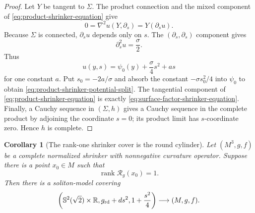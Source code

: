 \documentclass[10pt]{coll-l}
\newcommand{\R}{\mathbb{R}}
\newcommand{\Sph}{\mathbb{S}}
\newtheorem{corollary}[theorem]{Corollary}
\theoremstyle{definition}
\theoremstyle{remark}
\numberwithin{section}{chapter}
\numberwithin{equation}{chapter}
\begin{document}
\begin{proof}
Let $Y$ be tangent to $\Sigma$.  The product connection and the mixed
component of \eqref{eq:product-shrinker-equation} give
\[
       0=\nabla^2u(Y,\partial_s)=Y(\partial_su).
\]
Because $\Sigma$ is connected, $\partial_su$ depends only on $s$.  The
$(\partial_s,\partial_s)$ component gives
\[
                         \partial_s^2u=\frac\sigma2.
\]
Thus
\[
                 u(y,s)=\psi_0(y)+\frac\sigma4s^2+as
\]
for one constant $a$.  Put $s_0=-2a/\sigma$ and absorb the constant
$-\sigma s_0^2/4$ into $\psi_0$ to obtain
\eqref{eq:product-shrinker-potential-split}.  The tangential component of
\eqref{eq:product-shrinker-equation} is exactly
\eqref{eq:surface-factor-shrinker-equation}.  Finally, a Cauchy sequence in
$(\Sigma,h)$ gives a Cauchy sequence in the complete product by adjoining
the coordinate $s=0$; its product limit has $s$-coordinate zero.  Hence
$h$ is complete.
\end{proof}

\begin{corollary}[The rank-one shrinker cover is the round cylinder]
\label{cor:rank-one-shrinker-round-cylinder}
Let $(M^3,g,f)$ be a complete normalized shrinker with nonnegative
curvature operator.  Suppose there is a point $x_0\in M$ such that
\begin{equation}
                   \operatorname{rank}\mathcal R_g(x_0)=1.                \label{eq:rank-one-shrinker-witness}
\end{equation}
Then there is a soliton-model covering
\begin{equation}
        \left(\Sph^2(\sqrt2)\times\R,
          g_{\rm rd}+ds^2,1+\frac{s^2}{4}\right)
             \longrightarrow(M,g,f).                    \label{eq:rank-one-shrinker-cylinder-cover}
\end{equation}
\end{corollary}
\end{document}
